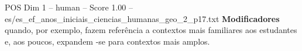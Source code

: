 \begin{textsample}{POS Dim 1 – human – Score 1.00 – es/es\_ef\_anos\_iniciais\_ciencias\_humanas\_geo\_2\_p17.txt}  \label{ex:f1_pos_020}
\textbf{Modificadores} quando, por exemplo, fazem referência a contextos mais familiares aos estudantes e, aos poucos, expandem -se para contextos mais amplos.

\end{textsample}
